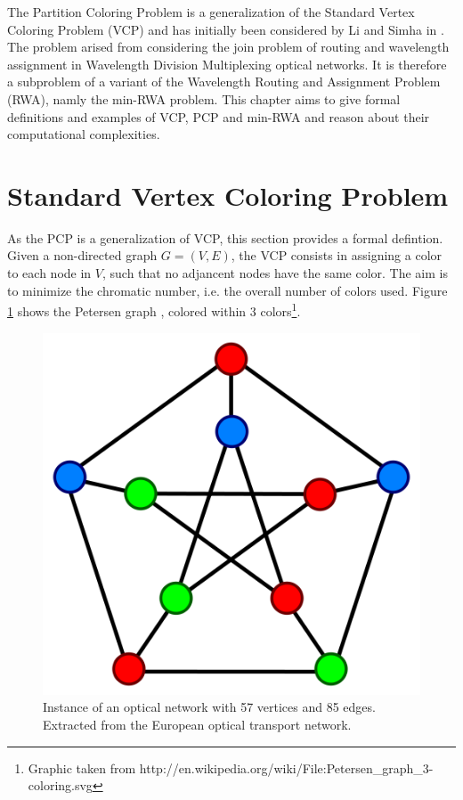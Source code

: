 
The Partition Coloring Problem is a generalization of the Standard Vertex Coloring Problem (VCP) and has initially been considered by Li and Simha in \cite{li-00}. The problem arised from considering the join problem of routing and wavelength assignment in Wavelength Division Multiplexing optical networks. It is therefore a subproblem of a variant of the Wavelength Routing and Assignment Problem (RWA), namly the min-RWA problem. This chapter aims to give formal definitions and examples of VCP, PCP and min-RWA and reason about their computational complexities.

\section{Standard Vertex Coloring Problem}
As the PCP is a generalization of VCP, this section provides a formal defintion.\\
Given a non-directed graph $G=(V,E)$, the VCP consists in assigning a color to each node in $V$, such that no adjancent nodes have the same color. The aim is to minimize the chromatic number, i.e. the overall number of colors used. Figure \ref{pd:vcp} shows the Petersen graph \cite{holton-08}, colored within 3 colors\footnote{Graphic taken from http://en.wikipedia.org/wiki/File:Petersen_graph_3-coloring.svg}.

\begin{figure}
\begin{center}
\includegraphics[scale=1]{figures/vcp.png}
\caption{Instance of an optical network with 57 vertices and 85 edges. Extracted from the European optical transport network. \cite{belgacem-13}}
\label{pd:vcp}
\end{center}
\end{figure}

